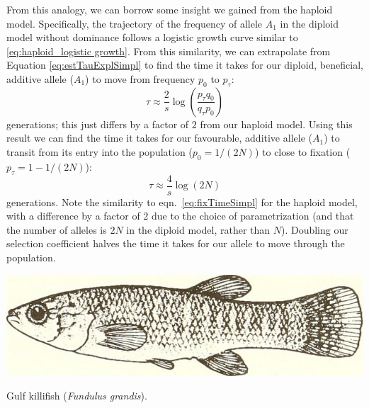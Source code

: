 From this analogy, we can borrow some insight we gained from the haploid model. Specifically, the trajectory of the frequency of allele $A_1$ in the diploid model without dominance follows a logistic growth curve similar to \eqref{eq:haploid_logistic growth}. From this similarity, we can extrapolate from Equation \eqref{eq:estTauExplSimpl} to find the time it takes for our diploid, beneficial, additive allele ($A_1$) to move from frequency $p_0$ to $p_{\tau}$:
\begin{equation}
	\tau \approx \frac{2}{s} \log \left(\frac{p_{\tau} q_0}{q_{\tau} p_0}\right)
\end{equation}
generations; this just differs by a factor of $2$ from our haploid model. Using this result we can find the time it takes for our favourable, additive allele ($A_1$) to transit from its entry into the population ($p_0 =1/(2N)$)
to close to fixation ($p_{\tau} =1-1/(2N)$):
\begin{equation}
	\tau \approx \frac{4}{s} \log(2N)  \label{eq:diploid_fix_time}
\end{equation}
generations. Note the similarity to eqn.\ \ref{eq:fixTimeSimpl} for the haploid model, with a difference
by a factor of 2 due to the choice of parametrization 
(and that the number of alleles is $2N$ in the diploid model, rather than $N$). Doubling our selection coefficient halves the time it takes for our allele to move through the population.\\


\begin{marginfigure}
\begin{center}
  \includegraphics[width = \textwidth]{illustration_images/single_locus_selection/killifish/20974603315_1f9775189e_z.jpg}
\end{center}
\caption{Gulf killifish ({\it Fundulus grandis}).  } \label{fig:killifish}
\end{marginfigure}

